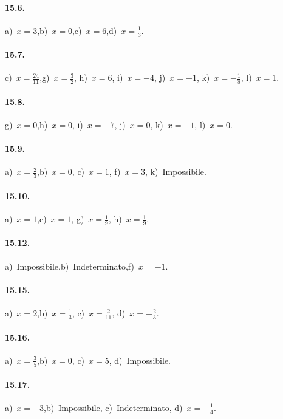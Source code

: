 \paragraph{15.6.}
a)~$x=3$,\quad b)~$x=0$,\quad c)~$x=6$,\quad d)~$x=\frac{1}{3}$.

\paragraph{15.7.}
c)~$x=\frac{24}{11}$,\quad g)~$x=\frac{3}{2}$, \quad h)~$x=6$, \quad i)~$x=-4$, \quad j)~$x=-1$, \quad k)~$x=-\frac{1}{8}$, \quad l)~$x=1$.

\paragraph{15.8.}
g)~$x=0$,\quad h)~$x=0$, \quad i)~$x=-7$, \quad j)~$x=0$, \quad k)~$x=-1$, \quad l)~$x=0$.

\paragraph{15.9.}
a)~$x=\frac{2}{3}$,\quad b)~$x=0$, \quad c)~$x=1$, \quad f)~$x=3$, \quad k)~Impossibile.

\paragraph{15.10.}
a)~$x=1$,\quad c)~$x=1$, \quad g)~$x=\frac{1}{9}$, \quad h)~$x=\frac{1}{9}$.

\paragraph{15.12.}
a)~Impossibile,\quad b)~Indeterminato,\quad f)~$x=-1$.

\paragraph{15.15.}
a)~$x=2$,\quad b)~$x=\frac{1}{3}$, \quad c)~$x=\frac{2}{11}$, \quad d)~$x=-\frac{2}{3}$.

\paragraph{15.16.}
a)~$x=\frac{3}{5}$,\quad b)~$x=0$, \quad c)~$x=5$, \quad d)~Impossibile.

\paragraph{15.17.}
a)~$x=-3$,\quad b)~Impossibile, \quad c)~Indeterminato, \quad d)~$x=-\frac{1}{4}$.

